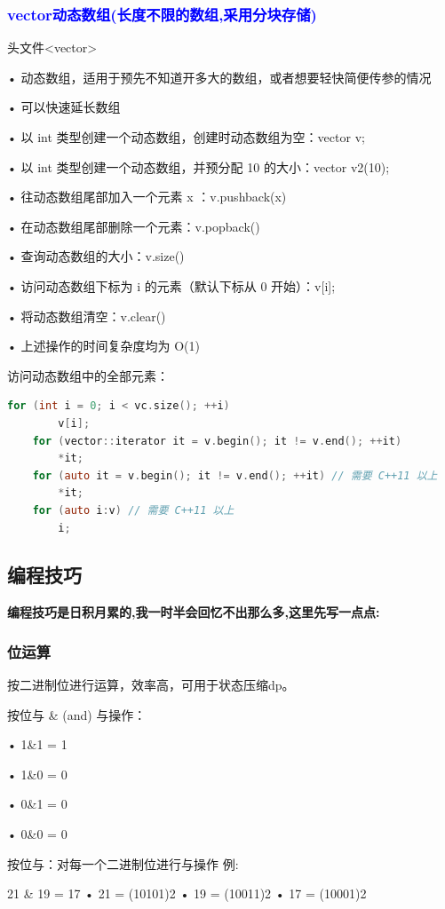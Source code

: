 \documentclass[UTF8]{ctexart}
\begin{document}
\subsubsection{\textcolor{blue}{vector动态数组(长度不限的数组,采用分块存储)}}
头文件<vector>

• 动态数组，适用于预先不知道开多大的数组，或者想要轻快简便传参的情况 

• 可以快速延长数组

• 以 int 类型创建一个动态数组，创建时动态数组为空：vector v; 

• 以 int 类型创建一个动态数组，并预分配 10 的大小：vector v2(10); 

• 往动态数组尾部加入一个元素 x ：v.push\textunderscore back(x) 

• 在动态数组尾部删除一个元素：v.pop\textunderscore back() 

• 查询动态数组的大小：v.size() 

• 访问动态数组下标为 i 的元素（默认下标从 0 开始）：v[i]; 

• 将动态数组清空：v.clear() 

• 上述操作的时间复杂度均为 O(1)

访问动态数组中的全部元素：
\begin{lstlisting}[language = C,basicstyle=\small\ttfamily]
    for (int i = 0; i < vc.size(); ++i) 
        v[i]; 
    for (vector::iterator it = v.begin(); it != v.end(); ++it) 
        *it; 
    for (auto it = v.begin(); it != v.end(); ++it) // 需要 C++11 以上 
        *it; 
    for (auto i:v) // 需要 C++11 以上 
        i;
\end{lstlisting}

\subsection{编程技巧}
\textbf{编程技巧是日积月累的,我一时半会回忆不出那么多,这里先写一点点:}
\subsubsection{位运算}
按二进制位进行运算，效率高，可用于状态压缩dp。

按位与 \& (and) 与操作： 

• 1\&1 = 1 

• 1\&0 = 0

• 0\&1 = 0

• 0\&0 = 0 

按位与：对每一个二进制位进行与操作 例: 

21 \& 19 = 17 • 21 = (10101)2 • 19 = (10011)2 • 17 = (10001)2
\end{document}

